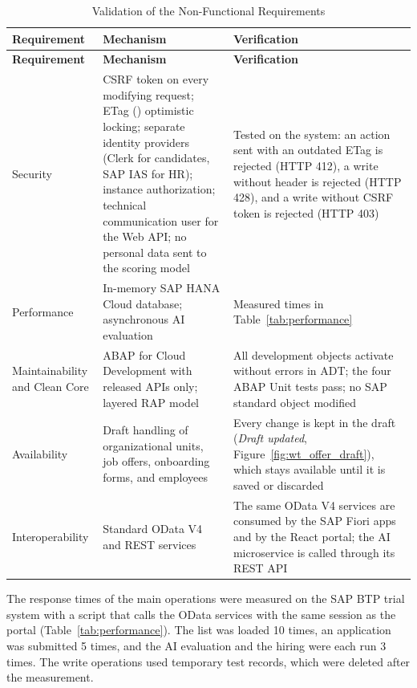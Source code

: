 \begingroup
\linespread{1}\selectfont
\renewcommand{\arraystretch}{1.4}
\begin{longtable}{@{}F{3.2cm}F{7.6cm}F{6.7cm}@{}}
\caption{Validation of the Non-Functional Requirements}\label{tab:nonfunctional_validation}\\
\toprule
\textbf{Requirement} & \textbf{Mechanism} & \textbf{Verification} \\
\midrule
\endfirsthead
\toprule
\textbf{Requirement} & \textbf{Mechanism} & \textbf{Verification} \\
\midrule
\endhead
\bottomrule
\endlastfoot
Security & CSRF token on every modifying request; ETag () optimistic locking; separate identity providers (Clerk for candidates, SAP IAS for HR); instance authorization; technical communication user for the Web API; no personal data sent to the scoring model & Tested on the system: an action sent with an outdated ETag is rejected (HTTP 412), a write without  header is rejected (HTTP 428), and a write without CSRF token is rejected (HTTP 403) \\
Performance & In-memory SAP HANA Cloud database; asynchronous AI evaluation & Measured times in Table~\ref{tab:performance} \\
Maintainability and Clean Core & ABAP for Cloud Development with released APIs only; layered RAP model & All development objects activate without errors in ADT; the four ABAP Unit tests pass; no SAP standard object modified \\
Availability & Draft handling of organizational units, job offers, onboarding forms, and employees & Every change is kept in the draft (\emph{Draft updated}, Figure~\ref{fig:wt_offer_draft}), which stays available until it is saved or discarded \\
Interoperability & Standard OData V4 and REST services & The same OData V4 services are consumed by the SAP Fiori apps and by the React portal; the AI microservice is called through its REST API \\
\end{longtable}
\endgroup

The response times of the main operations were measured on the SAP BTP trial system with a script that calls the OData services with the same session as the portal (Table~\ref{tab:performance}). The list was loaded 10 times, an application was submitted 5 times, and the AI evaluation and the hiring were each run 3 times. The write operations used temporary test records, which were deleted after the measurement.

